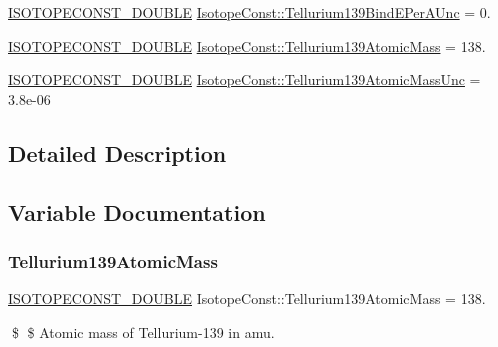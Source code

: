 \begin{DoxyCompactItemize}
\mbox{\hyperlink{group___isotope_const-_macros_ga8f45a7272ce02c0b4c65c44636ed719a}{I\+S\+O\+T\+O\+P\+E\+C\+O\+N\+S\+T\+\_\+\+D\+O\+U\+B\+LE}} \mbox{\hyperlink{group___isotope_const-_tellurium-_te139_ga034776920de1d1e6b331deed103ae6a5}{Isotope\+Const\+::\+Tellurium139\+Bind\+E\+Per\+A\+Unc}} = 0.
\item 
\mbox{\hyperlink{group___isotope_const-_macros_ga8f45a7272ce02c0b4c65c44636ed719a}{I\+S\+O\+T\+O\+P\+E\+C\+O\+N\+S\+T\+\_\+\+D\+O\+U\+B\+LE}} \mbox{\hyperlink{group___isotope_const-_tellurium-_te139_ga5090b70ba978e0d97ef96cf7c39915b0}{Isotope\+Const\+::\+Tellurium139\+Atomic\+Mass}} = 138.
\item 
\mbox{\hyperlink{group___isotope_const-_macros_ga8f45a7272ce02c0b4c65c44636ed719a}{I\+S\+O\+T\+O\+P\+E\+C\+O\+N\+S\+T\+\_\+\+D\+O\+U\+B\+LE}} \mbox{\hyperlink{group___isotope_const-_tellurium-_te139_ga53681bd99c095879bc3a7e27fb1a8fa9}{Isotope\+Const\+::\+Tellurium139\+Atomic\+Mass\+Unc}} = 3.\+8e-\/06
\end{DoxyCompactItemize}


\subsection{Detailed Description}


\subsection{Variable Documentation}
\mbox{\label{group___isotope_const-_tellurium-_te139_ga5090b70ba978e0d97ef96cf7c39915b0}} 
\subsubsection{\texorpdfstring{Tellurium139\+Atomic\+Mass}{Tellurium139AtomicMass}}
{\footnotesize\ttfamily \mbox{\hyperlink{group___isotope_const-_macros_ga8f45a7272ce02c0b4c65c44636ed719a}{I\+S\+O\+T\+O\+P\+E\+C\+O\+N\+S\+T\+\_\+\+D\+O\+U\+B\+LE}} Isotope\+Const\+::\+Tellurium139\+Atomic\+Mass = 138.}

\$ \$ Atomic mass of Tellurium-\/139 in amu. \mbox{\label{group___isotope_const-_tellurium-_te139_ga53681bd99c095879bc3a7e27fb1a8fa9}} 
